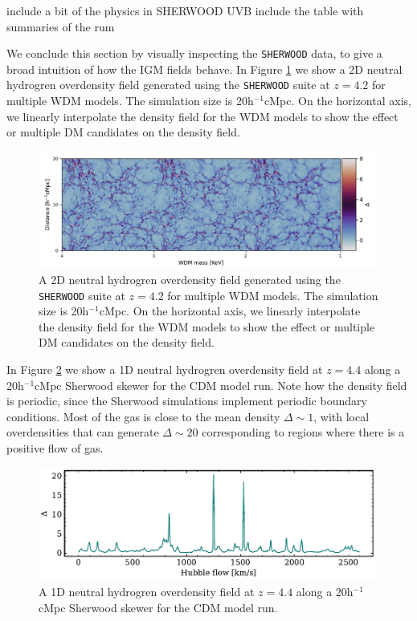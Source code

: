 include a bit of the physics in SHERWOOD UVB
include the table with summaries of the rum


We conclude this section by visually inspecting the \texttt{SHERWOOD} data, to give a broad intuition of how the IGM fields behave. In Figure \ref{fig: 2D density image} we show a 2D neutral hydrogren overdensity field generated using the \texttt{SHERWOOD} suite at $z=4.2$ for multiple WDM models. The simulation size is 20h$^{-1}$cMpc. On the horizontal axis, we linearly interpolate the density field for the WDM models to show the effect or multiple DM candidates on the density field.
\begin{figure}
        \centering
        \includegraphics[width=0.99\textwidth]{img/ML/density_image_wdm.pdf}
        \caption{A 2D neutral hydrogren overdensity field generated using the \texttt{SHERWOOD} suite at $z=4.2$ for multiple WDM models. The simulation size is 20h$^{-1}$cMpc. On the horizontal axis, we linearly interpolate the density field for the WDM models to show the effect or multiple DM candidates on the density field.}
        \label{fig: 2D density image}     
\end{figure}
In Figure \ref{fig: 1D density skewer} we show a  1D neutral hydrogren overdensity field at $z=4.4$ along a 20h$^{-1}$cMpc Sherwood skewer for the CDM model run. Note how the density field is periodic, since the Sherwood simulations implement periodic boundary conditions. Most of the gas is close to the mean density $\Delta \sim 1$, with local overdensities that can generate $\Delta \sim 20$ corresponding to regions where there is a positive flow of gas.
\begin{figure}
        \centering
        \includegraphics[width=0.99\textwidth]{img/ML/Skewer_density.pdf}
        \caption{A 1D neutral hydrogren overdensity field at $z=4.4$ along a 20h$^{-1}$cMpc Sherwood skewer for the CDM model run.}
        \label{fig: 1D density skewer}     
\end{figure}











